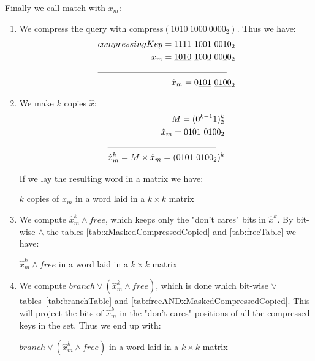 \begin{enumerate}
    Finally we call $\text{match}$ with $x_m$:
    \begin{enumerate}
        \item
        We compress the query with $\text{compress}(1010\ 1000\ 0000_2)$. Thus we have:
        \begin{align*}
            compressingKey = 1111\ 1001\ 0010_2\\
            x_m = \underline{1010}\ \underline{1}00\underline{0}\ 00\underline{0}0_2\\
            \cline{1-2}
            \hat x_m = 0\underline{101}\ \underline{0100}_2
        \end{align*}
        \item
        We make $k$ copies $\hat x$:
        \begin{align*}
            M = (0^{k-1}1)^k_2\\
            \hat x_m = 0101\ 0100_2\\
            \cline{1-2}
            \hat x^k_m = M \times \hat x_m = (0101\ 0100_2)^k\\
        \end{align*}
        
        If we lay the resulting word in a matrix we have:
        \begin{table}[H]
        \centering
        
        \caption{$k$ copies of $\hat x_m$ in a word laid in a $k \times k$ matrix}
        \label{tab:xMaskedCompressedCopied}
        \end{table}
        
        \item
        
        We compute $\hat x^k_m \wedge free$, which keeps only the "don't cares" bits in $\hat x^k$. By bit-wise $\wedge$ the tables \ref{tab:xMaskedCompressedCopied} and \ref{tab:freeTable} we have:
        \begin{table}[H]
        \centering
        
        \caption{$\hat x^k_m \wedge free$ in a word laid in a $k \times k$ matrix}
        \label{tab:freeANDxMaskedCompressedCopied}
        \end{table}
        
        \item
        We compute $branch \vee (\hat x^k_m \wedge free)$, which is done which bit-wise $\vee$ tables~\ref{tab:branchTable} and \ref{tab:freeANDxMaskedCompressedCopied}. This will project the bits of $\hat x^k_m$ in the "don't cares" positions of all the compressed keys in the set. Thus we end up with:
        \begin{table}[H]
        \centering
        
        \caption{$branch \vee (\hat x^k_m \wedge free)$ in a word laid in a $k \times k$ matrix}
        \label{tab:branchORfreeANDxMCopied}
        \end{table}
        

\end{enumerate}
\end{enumerate}
